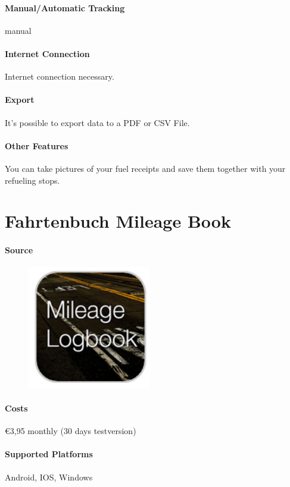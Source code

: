 \paragraph{Manual/Automatic Tracking} manual
\paragraph{Internet Connection} Internet connection necessary.
\paragraph{Export} It’s possible to export data to a PDF or CSV File.
\paragraph{Other Features} You can take pictures of your fuel receipts and save them together with your refueling stops.
\newpage

\section{Fahrtenbuch Mileage Book}
\paragraph{Source} 
\begin{figure}
  \begin{center}
    \includegraphics[width=0.48\textwidth]{mileage}
  \end{center}
\end{figure}
\paragraph{Costs} \euro 3,95 monthly (30 days testversion)
\paragraph{Supported Platforms} Android, IOS, Windows
